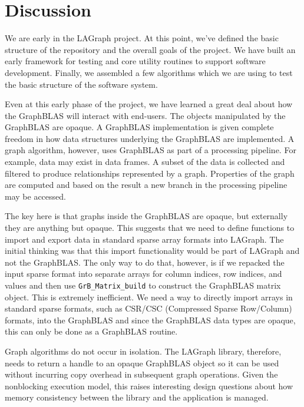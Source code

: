 \section{Discussion}
\label{sec:disc}

We are early in the LAGraph project.  At this point, we've defined the basic structure of the
repository and the overall goals of the project. We have built an early framework for testing
and core utility routines to support software development.  Finally, we assembled a few algorithms which we
are using to test the basic structure of the software system.

Even at this early phase of the project, we have learned a great deal about how the GraphBLAS
will interact with end-users.  The objects manipulated by the GraphBLAS are opaque.  A 
GraphBLAS implementation is given
complete freedom in how data structures underlying the GraphBLAS are implemented.  
A graph algorithm, however, uses GraphBLAS as part of a processing pipeline.  For example, data may
exist in data frames.  A subset of the data is collected and filtered to produce relationships
represented by a graph. Properties of the graph are computed and based on the result 
a new branch in the processing pipeline may be accessed.  

The key here is that graphs inside the GraphBLAS are opaque, but externally they are 
anything but opaque.  This suggests that we need to define functions to import and export 
data in standard sparse array formats into LAGraph.   The initial thinking was that this
import functionality would be part of LAGraph and not the GraphBLAS.  The only way to 
do that, however, is if we repacked the input sparse format into separate arrays for column 
indices, row indices, and values and then use \verb'GrB_Matrix_build' to construct the GraphBLAS
matrix object.  This is extremely inefficient.  We need a way to directly import arrays 
in standard sparse formats, such as CSR/CSC (Compressed Sparse Row/Column) formats,
into the GraphBLAS and since the GraphBLAS data types are
opaque, this can only be done as a GraphBLAS routine.  

Graph algorithms do not occur in isolation.   The LAGraph library, therefore, needs to 
return a handle to an opaque GraphBLAS object so it can be used without incurring copy overhead
in subsequent graph operations.  Given the nonblocking execution model, this raises interesting
design questions about how memory consistency between the library and the application is
managed.  

